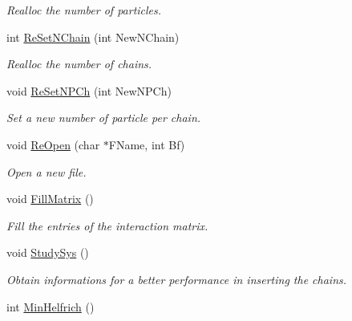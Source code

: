 \begin{DoxyCompactItemize}
\begin{DoxyCompactList}\small\item\em Realloc the number of particles. \end{DoxyCompactList}\item 
int \hyperlink{classForces_a935982eadb27b11f47553c06e7aa77ba}{Re\+Set\+N\+Chain} (int New\+N\+Chain)\hypertarget{classForces_a935982eadb27b11f47553c06e7aa77ba}{}\label{classForces_a935982eadb27b11f47553c06e7aa77ba}

\begin{DoxyCompactList}\small\item\em Realloc the number of chains. \end{DoxyCompactList}\item 
void \hyperlink{classForces_aa95d72aa125333d83e91047bc8f4319a}{Re\+Set\+N\+P\+Ch} (int New\+N\+P\+Ch)\hypertarget{classForces_aa95d72aa125333d83e91047bc8f4319a}{}\label{classForces_aa95d72aa125333d83e91047bc8f4319a}

\begin{DoxyCompactList}\small\item\em Set a new number of particle per chain. \end{DoxyCompactList}\item 
void \hyperlink{classForces_a3f36144668126bc6bb1c682c5b10b300}{Re\+Open} (char $\ast$F\+Name, int Bf)\hypertarget{classForces_a3f36144668126bc6bb1c682c5b10b300}{}\label{classForces_a3f36144668126bc6bb1c682c5b10b300}

\begin{DoxyCompactList}\small\item\em Open a new file. \end{DoxyCompactList}\item 
void \hyperlink{classForces_a5d2e87f58183d51c11ed77483b0d8b4f}{Fill\+Matrix} ()\hypertarget{classForces_a5d2e87f58183d51c11ed77483b0d8b4f}{}\label{classForces_a5d2e87f58183d51c11ed77483b0d8b4f}

\begin{DoxyCompactList}\small\item\em Fill the entries of the interaction matrix. \end{DoxyCompactList}\item 
void \hyperlink{classForces_a5404beae7f264277208ee9e55cbea66e}{Study\+Sys} ()
\begin{DoxyCompactList}\small\item\em Obtain informations for a better performance in inserting the chains. \end{DoxyCompactList}\item 
int \hyperlink{classForces_ad3b093268ba213a56fd6350ad4c861f2}{Min\+Helfrich} ()\hypertarget{classForces_ad3b093268ba213a56fd6350ad4c861f2}{}\label{classForces_ad3b093268ba213a56fd6350ad4c861f2}


\end{DoxyCompactItemize}
